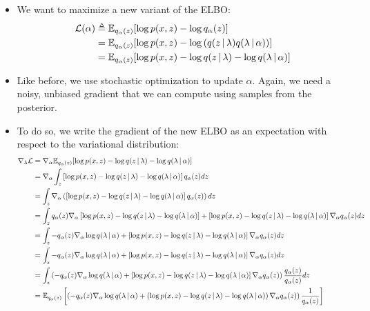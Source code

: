 \begin{itemize}
\item We want to maximize a new variant of the ELBO: 
\begin{align*}
\mathcal{L}(\alpha) &\triangleq \mathbb{E}_{q_\alpha(z)}[\log p(x,z) - \log q_\alpha(z)] \\
&= \mathbb{E}_{q_\alpha(z)}[\log p(x,z) - \log \left(q(z \, | \, \lambda) q(\lambda \, | \, \alpha)\right)] \\
&= \mathbb{E}_{q_\alpha(z)}[\log p(x,z) - \log q(z \, | \, \lambda) - \log q(\lambda \, | \, \alpha)]
\end{align*}
\item Like before, we use stochastic optimization to update $\alpha$.  Again, we need a noisy, unbiased gradient that we can compute using samples from the posterior.
\item To do so, we write the gradient of the new ELBO as an expectation with respect to the variational distribution:
\begin{align*}
\nabla_\lambda\mathcal{L} &= \nabla_\alpha \E_{q_\alpha(z)}[\log p(x,z) - \log q(z \g \lambda) - \log q(\lambda \g \alpha)] \\
&= \nabla_\alpha \int_z \left[\log p(x,z) - \log q(z \g \lambda) - \log q(\lambda \g \alpha)\right] q_\alpha(z) dz \\
&= \int_z \nabla_\alpha \left(\left[\log p(x,z) - \log q(z \g \lambda) - \log q(\lambda \g \alpha)\right] q_\alpha(z) \right) dz \\
 &= \int_z q_\alpha(z) \nabla_\alpha \left[\log p(x,z) - \log q(z \g \lambda) - \log q(\lambda \g \alpha)\right] + \left[\log p(x,z) - \log q(z \g \lambda) - \log q(\lambda \g \alpha)\right] \nabla_\alpha q_\alpha(z) dz \\
 &= \int_z - q_\alpha(z) \nabla_\alpha \log q(\lambda \g \alpha) + \left[\log p(x,z) - \log q(z \g \lambda) - \log q(\lambda \g \alpha)\right] \nabla_\alpha q_\alpha(z) dz \\
 &= \int_z - q_\alpha(z) \nabla_\alpha \log q(\lambda \g \alpha) + \left[\log p(x,z) - \log q(z \g \lambda) - \log q(\lambda \g \alpha)\right] \nabla_\alpha q_\alpha(z) dz \\
 &= \int_z \left(- q_\alpha(z) \nabla_\alpha \log q(\lambda \g \alpha) + \left[\log p(x,z) - \log q(z \g \lambda) - \log q(\lambda \g \alpha)\right] \nabla_\alpha q_\alpha(z)\right) \frac{q_\alpha(z)}{q_\alpha(z)} dz \\
 &= \E_{q_\alpha(z)}\left[ \left(- q_\alpha(z) \nabla_\alpha \log q(\lambda \g \alpha) + \left(\log p(x,z) - \log q(z \g \lambda) - \log q(\lambda \g \alpha)\right) \nabla_\alpha q_\alpha(z)\right) \frac{1}{q_\alpha(z)}\right] \\

\end{align*}
\end{itemize}
